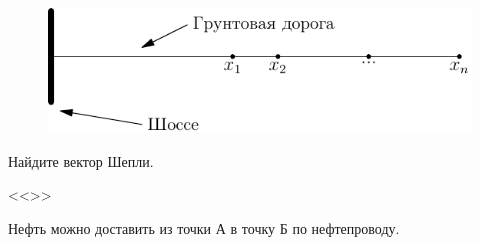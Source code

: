 %
%
%
%
%
% 








\begin{figure}[htbp]
	\includegraphics{coop_gadukino.pdf}
\end{figure}





Найдите вектор Шепли.

\vspace{5pt} <<>>

Нефть можно доставить из точки А в точку Б по нефтепроводу. 

%

%


